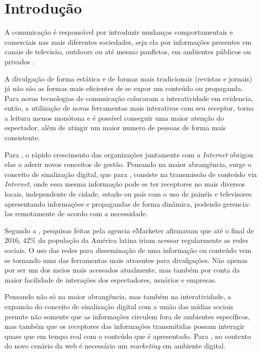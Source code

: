 \documentclass[
	12pt,				%
	openright,			%
	oneside,			%
	a4paper,			%
	english,			%
	french,				%
	spanish,			%
	brazil,				%
	]{abntex2}
\begin{document}
\frenchspacing 
\imprimircapa
\imprimirfolhaderosto*



\section*{Introdução}
	A comunicação é responsável por introduzir mudanças comportamentais e comerciais nas mais diferentes sociedades, seja ela por informações presentes em canais de televisão, outdoors ou até mesmo panfletos, em ambientes públicos ou privados \cite{silva2007}.
	
	A divulgação de forma estática e de formas mais tradicionais (revistas e jornais) já não são as formas mais eficientes de se expor um conteúdo ou propaganda. Para \cite{escobar2007} novas tecnologias de comunicação colocaram a interatividade em evidencia, então,  a utilização de novas ferramentas mais interativas com seu receptor, torna a leitura menos monótona e é possível conseguir uma maior atenção do espectador, além de atingir um maior numero de pessoas de forma mais consistente.
	
	Para \cite{machado2010}, o rápido crescimento das organizações juntamente com a \textit{Internet} obrigou elas a aderir novos conceitos de gestão. Pensando na maior abrangência, surge o conceito de sinalização digital, que para \cite{machado2010}, consiste na transmissão de conteúdo via \textit{Internet},  onde essa mesma informação pode se ter receptores no mais diversos locais, independente de cidade, estado ou país com o uso de painéis e televisores apresentando informações e propagandas de forma dinâmica, podendo gerencia-las remotamente de acordo com a necessidade.
	
	Segundo a \cite{forbes2016}, pesquisas feitas pela agencia eMarketer afirmavam que até o final de 2016, 42\% da população da América latina iriam acessar regularmente as redes sociais. O uso das redes para disseminação de uma informação ou conteúdo vem se tornando uma das ferramentas mais atraentes para divulgações. Não apenas por ser um dos meios mais acessados atualmente, mas também por conta da maior facilidade de interações dos espectadores, usuários e empresas.
	
	Pensando não só na maior abrangência, mas também na interatividade, a expansão do conceito de sinalização digital com a união das mídias sociais permite não somente que as informações circulem fora de ambientes específicos, mas também que os receptores das informações transmitidas possam interagir quase que em tempo real com o conteúdo que é apresentado. Para \cite{santos2014}, no contexto do novo cenário da web é necessário um \textit{marketing} em ambiente digital. 
	
\end{document}
